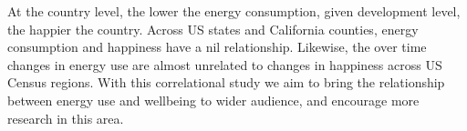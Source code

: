 \documentclass[10pt, letterpaper]{article}
\begin{document}
\begin{spacing}{1.0}

%

At the country level,  the lower the energy consumption, given development
level, the happier the country.  Across US states and California counties,
energy consumption and happiness have a nil relationship. 
Likewise, the over time changes in energy use are almost unrelated to changes in
 happiness across US Census regions. 
With this correlational study we aim to bring the relationship between energy
use and wellbeing to wider audience, and encourage more research in this area. 



\end{spacing}
\end{document}
